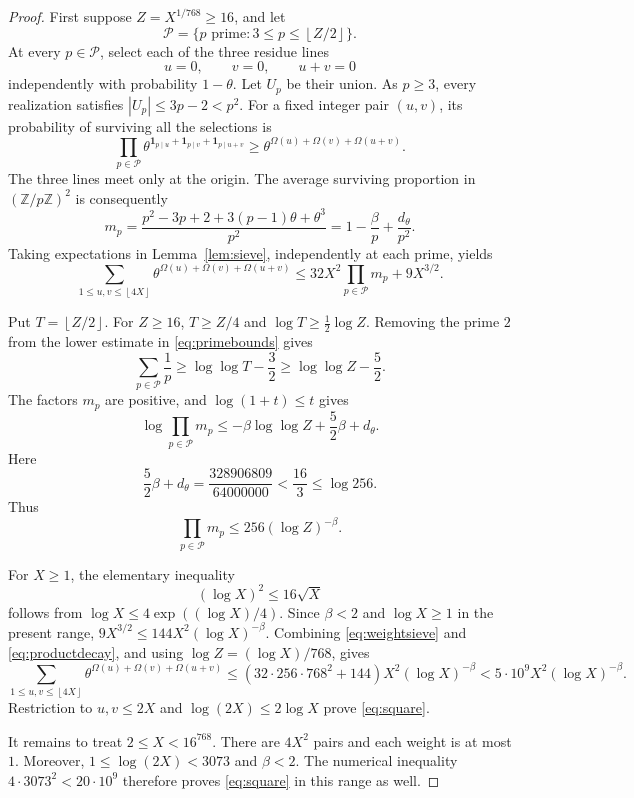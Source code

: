 \documentclass[11pt]{amsart}
\theoremstyle{definition}
\theoremstyle{remark}
\numberwithin{equation}{section}
\newcommand{\Z}{\mathbb Z}
\newcommand{\Om}{\Omega}
\newcommand{\ind}{\mathbf 1}
\newcommand{\floor}[1]{\left\lfloor #1\right\rfloor}
\begin{document}
\begin{proof}
First suppose $Z=X^{1/768}\ge16$, and let
\[
\mathcal P=\{p\text{ prime}:3\le p\le\floor{Z/2}\}.
\]
At every $p\in\mathcal P$, select each of the three residue lines
\[
u=0,\qquad v=0,\qquad u+v=0
\]
independently with probability $1-\theta$.
Let $U_p$ be their union.
As $p\ge3$, every realization satisfies $|U_p|\le3p-2<p^2$.
For a fixed integer pair $(u,v)$, its probability of surviving all the selections is
\[
\prod_{p\in\mathcal P}
\theta^{\ind_{p\mid u}+\ind_{p\mid v}+\ind_{p\mid u+v}}
\ge\theta^{\Om(u)+\Om(v)+\Om(u+v)}.
\]
The three lines meet only at the origin. The average surviving proportion in $(\Z/p\Z)^2$ is consequently
\begin{equation}\label{eq:localdensity}
m_p=\frac{p^2-3p+2+3(p-1)\theta+\theta^3}{p^2}
=1-\frac\beta p+\frac{d_\theta}{p^2}.
\end{equation}
Taking expectations in Lemma~\ref{lem:sieve}, independently at each prime, yields
\begin{equation}\label{eq:weightsieve}
\sum_{1\le u,v\le\floor{4X}}\theta^{\Om(u)+\Om(v)+\Om(u+v)}
\le32X^2\prod_{p\in\mathcal P}m_p+9X^{3/2}.
\end{equation}

Put $T=\floor{Z/2}$.
For $Z\ge16$, $T\ge Z/4$ and $\log T\ge\tfrac12\log Z$.
Removing the prime $2$ from the lower estimate in \eqref{eq:primebounds} gives
\[
\sum_{p\in\mathcal P}\frac1p
\ge\log\log T-\frac32
\ge\log\log Z-\frac52.
\]
The factors $m_p$ are positive, and $\log(1+t)\le t$ gives
\[
\log\prod_{p\in\mathcal P}m_p
\le-\beta\log\log Z+\frac52\beta+d_\theta.
\]
Here
\[
\frac52\beta+d_\theta=\frac{328906809}{64000000}<\frac{16}{3}\le\log256.
\]
Thus
\begin{equation}\label{eq:productdecay}
\prod_{p\in\mathcal P}m_p\le256(\log Z)^{-\beta}.
\end{equation}

For $X\ge1$, the elementary inequality
\begin{equation}\label{eq:logsqrt}
(\log X)^2\le16\sqrt X
\end{equation}
follows from $\log X\le4\exp((\log X)/4)$.
Since $\beta<2$ and $\log X\ge1$ in the present range,
$9X^{3/2}\le144X^2(\log X)^{-\beta}$.
Combining \eqref{eq:weightsieve} and \eqref{eq:productdecay}, and using $\log Z=(\log X)/768$, gives
\[
\sum_{1\le u,v\le\floor{4X}}\theta^{\Om(u)+\Om(v)+\Om(u+v)}
\le(32\cdot256\cdot768^2+144)X^2(\log X)^{-\beta}
<5\cdot10^9X^2(\log X)^{-\beta}.
\]
Restriction to $u,v\le2X$ and $\log(2X)\le2\log X$ prove \eqref{eq:square}.

It remains to treat $2\le X<16^{768}$.
There are $4X^2$ pairs and each weight is at most $1$.
Moreover, $1\le\log(2X)<3073$ and $\beta<2$.
The numerical inequality $4\cdot3073^2<20\cdot10^9$ therefore proves \eqref{eq:square} in this range as well.
\end{proof}
\end{document}

